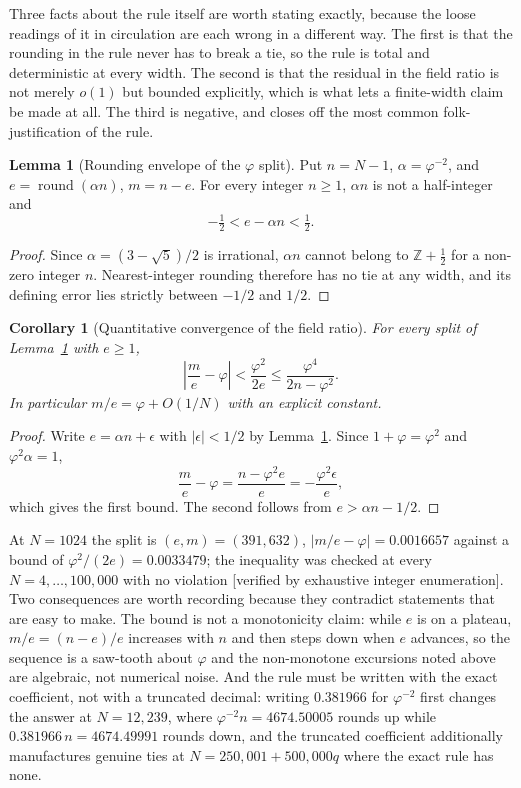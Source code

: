 \documentclass[11pt]{article}
\newtheorem{corollary}{Corollary}
\theoremstyle{definition}
\newtheorem{lemma}[theorem]{Lemma}
\begin{document}
Three facts about the rule itself are worth stating exactly, because the loose
readings of it in circulation are each wrong in a different way. The first is that
the rounding in the rule never has to break a tie, so the rule is total and
deterministic at every width. The second is that the residual in the field ratio
is not merely $o(1)$ but bounded explicitly, which is what lets a finite-width
claim be made at all. The third is negative, and closes off the most common
folk-justification of the rule.

\begin{lemma}[Rounding envelope of the $\varphi$ split]
\label{lem:phi-rounding-envelope}
Put $n=N-1$, $\alpha=\varphi^{-2}$, and $e=\operatorname{round}(\alpha n)$,
$m=n-e$. For every integer $n\geq1$, $\alpha n$ is not a half-integer and
\[
 -\tfrac12 < e-\alpha n < \tfrac12 .
\]
\end{lemma}
\begin{proof}
Since $\alpha=(3-\sqrt5)/2$ is irrational, $\alpha n$ cannot belong to
$\mathbb{Z}+\tfrac12$ for a non-zero integer $n$. Nearest-integer rounding
therefore has no tie at any width, and its defining error lies strictly between
$-1/2$ and $1/2$.
\end{proof}

\begin{corollary}[Quantitative convergence of the field ratio]
\label{cor:phi-ratio-bound}
For every split of Lemma~\ref{lem:phi-rounding-envelope} with $e\geq1$,
\[
 \left|\frac{m}{e}-\varphi\right|
 < \frac{\varphi^{2}}{2e}
 \leq \frac{\varphi^{4}}{2n-\varphi^{2}} .
\]
In particular $m/e=\varphi+O(1/N)$ with an explicit constant.
\end{corollary}
\begin{proof}
Write $e=\alpha n+\epsilon$ with $|\epsilon|<1/2$ by
Lemma~\ref{lem:phi-rounding-envelope}. Since $1+\varphi=\varphi^{2}$ and
$\varphi^{2}\alpha=1$,
\[
 \frac{m}{e}-\varphi=\frac{n-\varphi^{2}e}{e}=-\frac{\varphi^{2}\epsilon}{e},
\]
which gives the first bound. The second follows from $e>\alpha n-1/2$.
\end{proof}

At $N=1024$ the split is $(e,m)=(391,632)$, $|m/e-\varphi|=0.0016657$ against a
bound of $\varphi^{2}/(2e)=0.0033479$; the inequality was checked at every
$N=4,\dots,100{,}000$ with no violation [verified by exhaustive integer
enumeration]. Two consequences are worth recording because they contradict
statements that are easy to make. The bound is not a monotonicity claim: while
$e$ is on a plateau, $m/e=(n-e)/e$ increases with $n$ and then steps down when
$e$ advances, so the sequence is a saw-tooth about $\varphi$ and the non-monotone
excursions noted above are algebraic, not numerical noise. And the rule must be
written with the exact coefficient, not with a truncated decimal: writing
$0.381966$ for $\varphi^{-2}$ first changes the answer at $N=12{,}239$, where
$\varphi^{-2}n=4674.50005$ rounds up while $0.381966\,n=4674.49991$ rounds down,
and the truncated coefficient additionally manufactures genuine ties at
$N=250{,}001+500{,}000q$ where the exact rule has none.
\end{document}
